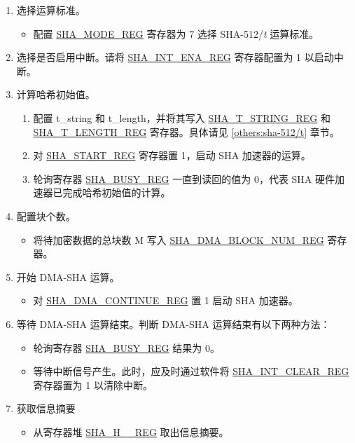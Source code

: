 \documentclass[main\_\_CN.tex]{subfiles}
\begin{document}
\begin{enumerate}
    \item 选择运算标准。
        \begin{itemize}
            \item 配置 \hyperref[regdesc:SHAMODEREG]{SHA\_MODE\_REG} 寄存器为 7 选择 SHA-512/{\it{t}} 运算标准。
        \end{itemize}

    \item 选择是否启用中断。请将 \hyperref[regdesc:SHAINTENAREG]{SHA\_INT\_ENA\_REG} 寄存器配置为 1 以启动中断。

    \item 计算哈希初始值。
        \begin{enumerate}
            \item 配置 t\_string 和 t\_length，并将其写入 \hyperref[regdesc:SHATSTRINGREG]{SHA\_T\_STRING\_REG} 和 \hyperref[regdesc:SHATLENGTHREG]{SHA\_T\_LENGTH\_REG} 寄存器。具体请见 \ref{others:sha-512/t} 章节。
            \item 对 \hyperref[regdesc:SHASTARTREG]{SHA\_START\_REG} 寄存器置 1，启动 SHA 加速器的运算。
            \item 轮询寄存器 \hyperref[regdesc:SHABUSYREG]{SHA\_BUSY\_REG} 一直到读回的值为 0，代表 SHA 硬件加速器已完成哈希初始值的计算。
        \end{enumerate}

    \item 配置块个数。
        \begin{itemize}
            \item 将待加密数据的总块数 M 写入  \hyperref[regdesc:SHADMABLOCKNUMREG]{SHA\_DMA\_BLOCK\_NUM\_REG} 寄存器。
        \end{itemize}

    \item 开始 DMA-SHA 运算。
        \begin{itemize}
            \item 对 \hyperref[regdesc:SHADMACONTINUEREG]{SHA\_DMA\_CONTINUE\_REG} 置 1 启动 SHA 加速器。
        \end{itemize}

    \item 等待 DMA-SHA 运算结束。判断 DMA-SHA 运算结束有以下两种方法：
        \begin{itemize}
            \item 轮询寄存器 \hyperref[regdesc:SHABUSYREG]{SHA\_BUSY\_REG} 结果为 0。
            \item 等待中断信号产生。此时，应及时通过软件将 \hyperref[regdesc:SHAINTCLEARREG]{SHA\_INT\_CLEAR\_REG} 寄存器置为 1 以清除中断。
        \end{itemize}

    \item 获取信息摘要
        \begin{itemize}
            \item 从寄存器堆 \hyperref[regdesc:SHAHNREG]{SHA\_H\_\_REG} 取出信息摘要。
        \end{itemize}
\end{enumerate}
\end{document}
